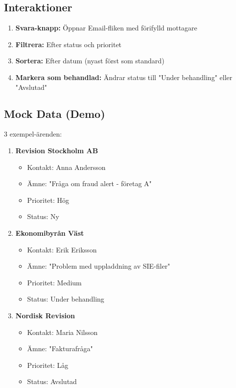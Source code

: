 \documentclass[12pt,a4paper]{article}
\begin{document}
\subsection{Interaktioner}
\begin{enumerate}
  \item \textbf{Svara-knapp:} Öppnar Email-fliken med förifylld mottagare
  \item \textbf{Filtrera:} Efter status och prioritet
  \item \textbf{Sortera:} Efter datum (nyast först som standard)
  \item \textbf{Markera som behandlad:} Ändrar status till "Under behandling" eller "Avslutad"
\end{enumerate}

\subsection{Mock Data (Demo)}
3 exempel-ärenden:

\begin{enumerate}
  \item \textbf{Revision Stockholm AB}
  \begin{itemize}
    \item Kontakt: Anna Andersson
    \item Ämne: "Fråga om fraud alert - företag A"
    \item Prioritet: Hög
    \item Status: Ny
  \end{itemize}
  
  \item \textbf{Ekonomibyrån Väst}
  \begin{itemize}
    \item Kontakt: Erik Eriksson
    \item Ämne: "Problem med uppladdning av SIE-filer"
    \item Prioritet: Medium
    \item Status: Under behandling
  \end{itemize}
  
  \item \textbf{Nordisk Revision}
  \begin{itemize}
    \item Kontakt: Maria Nilsson
    \item Ämne: "Fakturafråga"
    \item Prioritet: Låg
    \item Status: Avslutad
  \end{itemize}
\end{enumerate}
\end{document}
